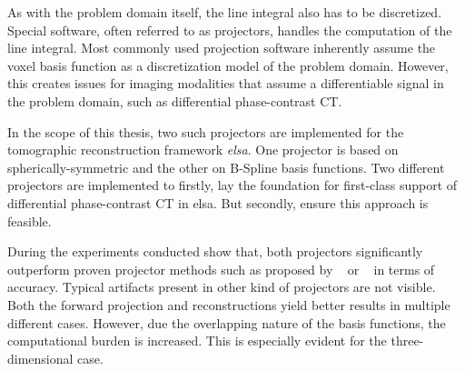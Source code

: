 As with the problem domain itself, the line integral also has to be discretized. Special software,
often referred to as projectors, handles the computation of the line integral. Most commonly used
projection software inherently assume the voxel basis function as a discretization model of the
problem domain. However, this creates issues for imaging modalities that assume a differentiable
signal in the problem domain, such as differential phase-contrast CT\@.

In the scope of this thesis, two such projectors are implemented for the tomographic reconstruction
framework \textit{elsa}. One projector is based on spherically-symmetric and the other on B-Spline
basis functions. Two different projectors are implemented to firstly, lay the foundation for
first-class support of differential phase-contrast CT in elsa. But secondly, ensure this approach is
feasible.

During the experiments conducted show that, both projectors significantly outperform proven
projector methods such as proposed by \citeauthor*{siddon_fast_1985}~\cite{siddon_fast_1985} or
\citeauthor*{joseph_improved_1982}~\cite{joseph_improved_1982} in terms of accuracy. Typical
artifacts present in other kind of projectors are not visible. Both the forward projection and
reconstructions yield better results in multiple different cases. However, due the overlapping
nature of the basis functions, the computational burden is increased. This is especially evident for
the three-dimensional case.
